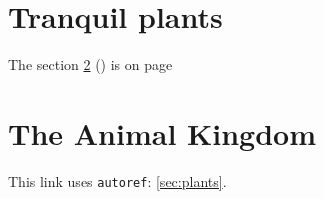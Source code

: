 \documentclass{article}
\begin{document}
\section{Tranquil plants}
\label{sec:plants}
The section \ref{sec:animals} ()
is on page \pageref{sec:animals}

\section{The Animal Kingdom}
\label{sec:animals}
This link uses \verb=autoref=: \autoref{sec:plants}.
\end{document}
